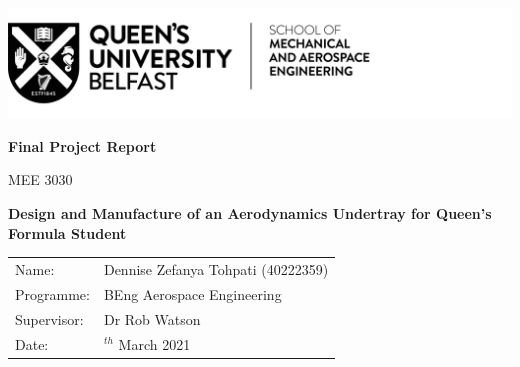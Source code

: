 \begin{titlepage}
\includegraphics[scale=1]{Figures/QUB LOGO - SMAE.png}
\centering

\vspace{4cm}
\textbf{Final Project Report}

MEE 3030

\vspace{2cm}
\textbf{\large{Design and Manufacture of an Aerodynamics Undertray for Queen's Formula Student}}


\vspace{8cm}
\begin{tabularx}{1\textwidth}{ 
   >{\raggedleft\arraybackslash}X 
   >{\raggedright\arraybackslash}X 
  }
  
Name: & \quad Dennise Zefanya Tohpati (40222359)\\
Programme: & \quad BEng Aerospace Engineering\\
Supervisor: & \quad Dr Rob Watson\\
Date: & \quad 29$^{th}$ March 2021\\

\end{tabularx}
\end{titlepage}

